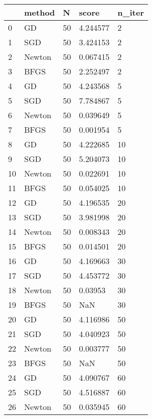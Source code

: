 \begin{tabular}{lllll}
\toprule
{} &  method &        N &      score & n\_iter \\
\midrule
0   &      GD &       50 &   4.244577 &      2 \\
1   &     SGD &       50 &   3.424153 &      2 \\
2   &  Newton &       50 &   0.067415 &      2 \\
3   &    BFGS &       50 &   2.252497 &      2 \\
4   &      GD &       50 &   4.243568 &      5 \\
5   &     SGD &       50 &   7.784867 &      5 \\
6   &  Newton &       50 &   0.039649 &      5 \\
7   &    BFGS &       50 &   0.001954 &      5 \\
8   &      GD &       50 &   4.222685 &     10 \\
9   &     SGD &       50 &   5.204073 &     10 \\
10  &  Newton &       50 &   0.022691 &     10 \\
11  &    BFGS &       50 &   0.054025 &     10 \\
12  &      GD &       50 &   4.196535 &     20 \\
13  &     SGD &       50 &   3.981998 &     20 \\
14  &  Newton &       50 &   0.008343 &     20 \\
15  &    BFGS &       50 &   0.014501 &     20 \\
16  &      GD &       50 &   4.169663 &     30 \\
17  &     SGD &       50 &   4.453772 &     30 \\
18  &  Newton &       50 &    0.03953 &     30 \\
19  &    BFGS &       50 &        NaN &     30 \\
20  &      GD &       50 &   4.116986 &     50 \\
21  &     SGD &       50 &   4.040923 &     50 \\
22  &  Newton &       50 &   0.003777 &     50 \\
23  &    BFGS &       50 &        NaN &     50 \\
24  &      GD &       50 &   4.090767 &     60 \\
25  &     SGD &       50 &   4.516887 &     60 \\
26  &  Newton &       50 &   0.035945 &     60 \\

\end{tabular}
